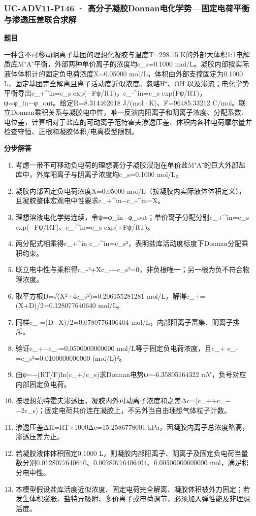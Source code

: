 \documentclass[UTF8,11pt,a4paper]{ctexart}
\begin{document}
\subsubsection*{UC-ADV11-P146 · 高分子凝胶Donnan电化学势—固定电荷平衡与渗透压差联合求解}
\noindent\textbf{题目}\par
一种含不可移动阴离子基团的理想化凝胶与温度T=298.15 K的外部大体积1:1电解质库M⁺A⁻平衡，外部两种单价离子的浓度均c\_s=0.1000 mol/L。凝胶内部按实际液体体积计的固定负电荷浓度X=0.05000 mol/L，体积由外部支撑固定为0.1000 L，固定基团完全解离且离子活动度近似浓度。忽略H⁺、OH⁻以及渗流；电化学势平衡导出c\_+\textasciicircum{}in=c\_s exp(−Fψ/RT)，c\_-\textasciicircum{}in=c\_s exp(Fψ/RT)，ψ=φ\_in−φ\_out。给定R=8.314462618 J/(mol·K)、F=96485.33212 C/mol。联立Donnan乘积关系与凝胶电中性，唯一反演内阳离子和阴离子浓度、分配系数、电位差，计算相对于盐库的可动离子范特霍夫渗透压差、体积内各种电荷摩尔量并检查守恒、正根和凝胶体积/电离模型限制。\par
\medskip\noindent\textbf{分步解答}
\begin{enumerate}
\item 考虑一带不可移动负电荷的理想高分子凝胶浸泡在单价盐M⁺A⁻的巨大外部盐库中，外库阳离子与阴离子浓度均c\_s=0.1000 mol/L。
\item 凝胶内部固定负电荷浓度X=0.05000 mol/L（按凝胶内实际液体体积定义），且凝胶整体宏观电中性要求c\_+\textasciicircum{}in−c\_-\textasciicircum{}in=X。
\item 理想溶液电化学势连续，令ψ=φ\_in−φ\_out；单价离子分配分别c\_+\textasciicircum{}in=c\_s exp(−Fψ/RT)、c\_-\textasciicircum{}in=c\_s exp(+Fψ/RT)。
\item 两分配式相乘得c\_+\textasciicircum{}in c\_-\textasciicircum{}in=c\_s²，表明盐库活动度标度下Donnan分配乘积约束。
\item 联立电中性与乘积得c\_-²+Xc\_-−c\_s²=0，非负根唯一；另一根为负不符合物理浓度。
\item 取平方根D=√(X²+4c\_s²)=0.206155281281 mol/L，解得c\_+=(X+D)/2=0.128077640640 mol/L。
\item 同样c\_-=(D−X)/2=0.0780776406404 mol/L，内部阳离子富集、阴离子排斥。
\item 验证c\_+−c\_-=0.0500000000000 mol/L等于固定负电荷浓度，且c\_+ c\_-=c\_s²=0.0100000000000 (mol/L)²。
\item 由ψ=−(RT/F)ln(c\_+/c\_s)求Donnan电势ψ=-6.35805164322 mV，负号对应内部固定负电荷。
\item 按理想范特霍夫渗透压，凝胶内外可动离子浓度和之差Δc=(c\_++c\_−−2c\_s)；固定电荷共价连在凝胶上，不另外当自由理想气体粒子计数。
\item 渗透压差ΔΠ=RT×1000Δc=15.2586778001 kPa，因凝胶内离子总浓度略高，渗透压差为正。
\item 若凝胶液体体积固定0.1000 L，则凝胶内部阳离子、阴离子及固定负电荷当量数分别0.0128077640640、0.00780776406404、0.00500000000000 mol，满足积分电中性。
\item 本模型假设盐库活度近似浓度、固定电荷完全解离、凝胶体积被外力固定；若发生体积膨胀、盐特异吸附、多价离子或电荷调节，必须加入弹性能及非理想活度。
\end{enumerate}
\end{document}
